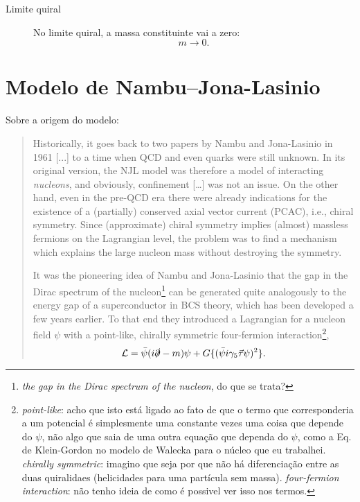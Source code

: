 \begin{description}
	\item[Limite quiral] No limite quiral, a massa constituinte vai a zero:
		\begin{equation}
			m \to 0.
		\end{equation}
\end{description}

\section{Modelo de Nambu--Jona-Lasinio}

Sobre a origem do modelo\cite{Buballa}:
\begin{quote}
Historically, it goes back to two papers by Nambu and Jona-Lasinio in 1961 [...] to a time when QCD and even quarks were still unknown. In its original version, the NJL model was therefore a model of interacting \emph{nucleons}, and obviously, confinement [\dots] was not an issue. On the other hand, even in the pre-QCD era there were already indications for the existence of a (partially) conserved axial vector current (PCAC), i.e., chiral symmetry. Since (approximate) chiral symmetry implies (almost) massless fermions on the Lagrangian level, the problem was to find a mechanism which explains the large nucleon mass without destroying the symmetry.

It was the pioneering idea of Nambu and Jona-Lasinio that the gap in the Dirac spectrum of the nucleon\footnote{\emph{the gap in the Dirac spectrum of the nucleon}, do que se trata?} can be generated quite analogously to the energy gap of a superconductor in BCS theory, which has been developed a few years earlier. To that end they introduced a Lagrangian for a nucleon field $\psi$ with a point-like, chirally symmetric four-fermion interaction\footnote{\emph{point-like}: acho que isto está ligado ao fato de que o termo que corresponderia a um potencial é simplesmente uma constante vezes uma coisa que depende do $\psi$, não algo que saia de uma outra equação que dependa do $\psi$, como a Eq. de Klein-Gordon no modelo de Walecka para o núcleo que eu trabalhei. \emph{chirally symmetric}: imagino que seja por que não há diferenciação entre as duas quiralidaes (helicidades para uma partícula sem massa). \emph{four-fermion interaction}: não tenho ideia de como é possivel ver isso nos termos.},
\begin{equation}\label{Eq:LagOriginalNJL}
	\mathcal{L} = \bar{\psi}(i\slashed{\partial} - m)\psi + G\{(\bar{\psi}i\gamma_5\vec{\tau}\psi)^2\}.
\end{equation}
\end{quote}
